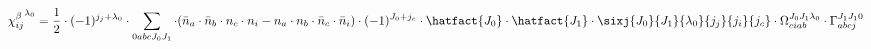
\begin{dmath*}
{\chi^{\beta}_{i j}}^{{{\lambda}}_{0}} = \frac{1}{2} \cdot (-1)^{{j}_{j}+{{\lambda}}_{0}} \cdot \sum_{0 a b c {J}_{0} {J}_{1}} \cdot (\bar{n}_{a} \cdot \bar{n}_{b} \cdot n_{c} \cdot n_{i} -n_{a} \cdot n_{b} \cdot \bar{n}_{c} \cdot \bar{n}_{i}) \cdot (-1)^{{J}_{0}+{j}_{c}} \cdot \hatfact{{J}_{0}} \cdot \hatfact{{J}_{1}} \cdot \sixj{{J}_{0}}{{J}_{1}}{{{\lambda}}_{0}}{{j}_{j}}{{j}_{i}}{{j}_{c}} \cdot \Omega_{c i a b}^{{J}_{0} {J}_{1} {{\lambda}}_{0}} \cdot \Gamma_{a b c j}^{{J}_{1} {J}_{1} 0}
\end{dmath*}

